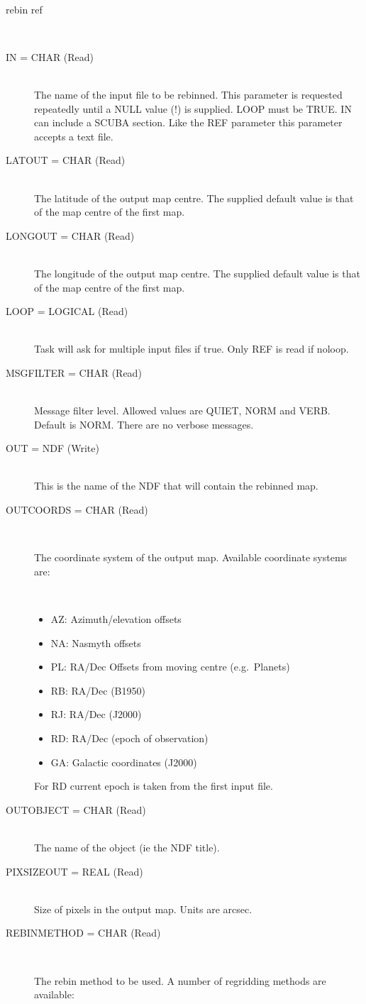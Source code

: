 \documentclass[twoside,11pt]{article}
\newcommand{\htmlref}[2]{#1}
\renewcommand{\_}{\texttt{\symbol{95}}}
\newcommand{\sstusage}[1]{\item[Usage:] \mbox{}
\\[1.3ex]{\raggedright \ssttt #1}}
\newcommand{\sstparameters}[1]{
   \item[Parameters:] \mbox{} \\
   \vspace{-3.5ex}
   \begin{description}
      #1
   \end{description}
}
\newcommand{\sstsubsection}[1]{ \item[{#1}] \mbox{} \\}
\newcommand{\sstitemlist}[1]{
  \mbox{} \\
  \vspace{-3.5ex}
  \begin{itemize}
     #1
  \end{itemize}
}
\newcommand{\sstitem}{\item}
\newcommand{\sstusage}[1]{\item[Usage:]
      \begin{description}
         {\ssttt #1}
      \end{description}
      \\
   }
\newcommand{\sstparameters}[1]{
      \item[Parameters:] \\
      \begin{description}
         #1
      \end{description}
      \\
   }
\newcommand{\sstsubsection}[1]{\item[{#1}]}
\newcommand{\sstitemlist}[1]{
      \begin{itemize}
         #1
      \end{itemize}
      \\
   }
\newcommand{\sstitem}{\item}
\begin{document}
{{{      }
   }
   \sstusage{
      rebin ref
   }
   \sstparameters{
      \sstsubsection{
         IN = CHAR (Read)
      }{
         The name of the input file to be rebinned. This parameter is requested
         repeatedly until a NULL value (!) is supplied. LOOP must be TRUE.
         IN can include a \htmlref{SCUBA section}{sections}.
         Like the REF parameter this parameter accepts a text file.
      }
      \sstsubsection{
         LAT\_OUT = CHAR (Read)
      }{
         The latitude of the output map centre. The supplied default value
         is that of the map centre of the first map.
      }
      \sstsubsection{
         LONG\_OUT = CHAR (Read)
      }{
         The longitude of the output map centre. The supplied default value
         is that of the map centre of the first map.
      }
      \sstsubsection{
         LOOP = LOGICAL (Read)
      }{
         Task will ask for multiple input files if true. Only REF is read
         if noloop.
      }
      \sstsubsection{
         MSG\_FILTER = CHAR (Read)
      }{
         Message filter level. Allowed values are QUIET, NORM and VERB.
         Default is NORM. There are no verbose messages.
      }
      \sstsubsection{
         OUT = NDF (Write)
      }{
         This is the name of the NDF that will contain the rebinned
         map. 
      }
      \sstsubsection{
         OUT\_COORDS = CHAR (Read)
      }{
         The coordinate system of the output map. Available coordinate
         systems are:
         \sstitemlist{

            \sstitem
            AZ:  Azimuth/elevation offsets

            \sstitem
            NA:  Nasmyth offsets

            \sstitem
            PL:  RA/Dec Offsets from moving centre (e.g.\ Planets)

            \sstitem
            RB:  RA/Dec (B1950)

            \sstitem
            RJ:  RA/Dec (J2000)

            \sstitem
            RD:  RA/Dec (epoch of observation)

            \sstitem
            GA:  Galactic coordinates (J2000)

         }
         For RD current epoch is taken from the first input file.
      }
      \sstsubsection{
         OUT\_OBJECT = CHAR (Read)
      }{
         The name of the object (ie the NDF title).
      }
      \sstsubsection{
         PIXSIZE\_OUT = REAL (Read)
      }{
         Size of pixels in the output map. Units are arcsec.
      }
      \sstsubsection{
         REBIN\_METHOD = CHAR (Read)
      }{
         The rebin method to be used. A number of regridding methods are
         available:
         \sstitemlist{

}}}}
\end{document}
